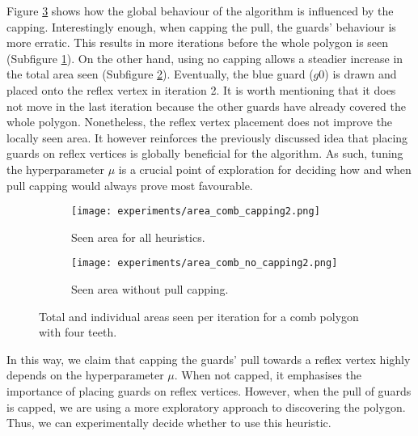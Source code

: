 Figure \ref{fig:no_cap_plots} shows how the global behaviour of the algorithm is influenced by the capping. Interestingly enough, when capping the pull, the guards' behaviour is more erratic. This results in more iterations before the whole polygon is seen (Subfigure \ref{fig:area_all_cap}).  On the other hand, using no capping allows a steadier increase in the total area seen (Subfigure \ref{fig:area_no_cap}). Eventually, the blue guard ($g0$) is drawn and placed onto the reflex vertex in iteration 2. It is worth mentioning that it does not move in the last iteration because the other guards have already covered the whole polygon. Nonetheless, the reflex vertex placement does not improve the locally seen area. It however reinforces the previously discussed idea that placing guards on reflex vertices is globally beneficial for the algorithm. As such, tuning the hyperparameter $\mu$ is a crucial point of exploration for deciding how and when pull capping would always prove most favourable.

\begin{figure}[!h]
    \begin{subfigure}{0.45\textwidth}
        \texttt{[image: experiments/area\_comb\_capping2.png]}
        \caption{Seen area for all heuristics.}
        \label{fig:area_all_cap}
    \end{subfigure}
    \hfill
    \begin{subfigure}{0.45\textwidth}
        \texttt{[image: experiments/area\_comb\_no\_capping2.png]}
        \caption{Seen area without pull capping.}
        \label{fig:area_no_cap}
    \end{subfigure}
    \caption{Total and individual areas seen per iteration for a comb polygon with four teeth.}
    \label{fig:no_cap_plots}
\end{figure}

In this way, we claim that capping the guards' pull towards a reflex vertex highly depends on the hyperparameter $\mu$. When not capped, it emphasises the importance of placing guards on reflex vertices. However, when the pull of guards is capped, we are using a more exploratory approach to discovering the polygon. Thus, we can experimentally decide whether to use this heuristic. 

\newpage
